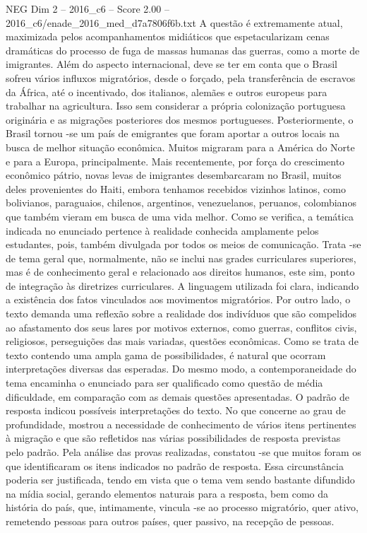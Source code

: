 \begin{textsample}{NEG Dim 2 – 2016\_c6 – Score 2.00 – 2016\_c6/enade\_2016\_med\_d7a7806f6b.txt}
A questão é extremamente atual, maximizada pelos acompanhamentos midiáticos que espetacularizam cenas dramáticas do processo de fuga de massas humanas das guerras, como a morte de imigrantes.
Além do aspecto internacional, deve se ter em conta que o Brasil sofreu vários influxos migratórios, desde o forçado, pela transferência de escravos da África, até o incentivado, dos italianos, alemães e outros europeus para trabalhar na agricultura.
Isso sem considerar a própria colonização portuguesa originária e as migrações posteriores dos mesmos portugueses.
Posteriormente, o Brasil tornou -se um país de emigrantes que foram aportar a outros locais na busca de melhor situação econômica.
Muitos migraram para a América do Norte e para a Europa, principalmente.
Mais recentemente, por força do crescimento econômico pátrio, novas levas de imigrantes desembarcaram no Brasil, muitos deles provenientes do Haiti, embora tenhamos recebidos vizinhos latinos, como bolivianos, paraguaios, chilenos, argentinos, venezuelanos, peruanos, colombianos que também vieram em busca de uma vida melhor.
Como se verifica, a temática indicada no enunciado pertence à realidade conhecida amplamente pelos estudantes, pois, também divulgada por todos os meios de comunicação.
Trata -se de tema geral que, normalmente, não se inclui nas grades curriculares superiores, mas é de conhecimento geral e relacionado aos direitos humanos, este sim, ponto de integração às diretrizes curriculares.
A linguagem utilizada foi clara, indicando a existência dos fatos vinculados aos movimentos migratórios.
Por outro lado, o texto demanda uma reflexão sobre a realidade dos indivíduos que são compelidos ao afastamento dos seus lares por motivos externos, como guerras, conflitos civis, religiosos, perseguições das mais variadas, questões econômicas.
Como se trata de texto contendo uma ampla gama de possibilidades, é natural que ocorram interpretações diversas das esperadas.
Do mesmo modo, a contemporaneidade do tema encaminha o enunciado para ser qualificado como questão de média dificuldade, em comparação com as demais questões apresentadas.
O padrão de resposta indicou possíveis interpretações do texto.
No que concerne ao grau de profundidade, mostrou a necessidade de conhecimento de vários itens pertinentes à migração e que são refletidos nas várias possibilidades de resposta previstas pelo padrão.
Pela análise das provas realizadas, constatou -se que muitos foram os que identificaram os itens indicados no padrão de resposta.
Essa circunstância poderia ser justificada, tendo em vista que o tema vem sendo bastante difundido na mídia social, gerando elementos naturais para a resposta, bem como da história do país, que, intimamente, vincula -se ao processo migratório, quer ativo, remetendo pessoas para outros países, quer passivo, na recepção de pessoas.

\end{textsample}
